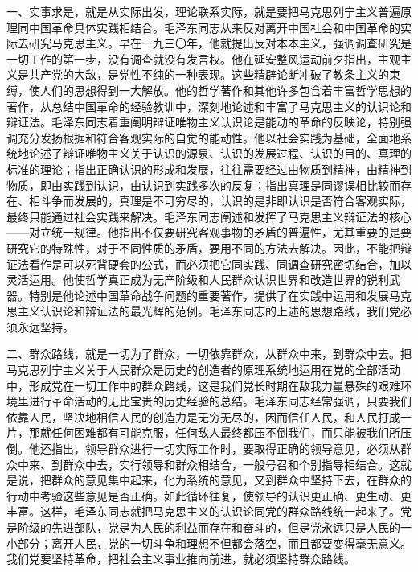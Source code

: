 一、实事求是，就是从实际出发，理论联系实际，就是要把马克思列宁主义普遍原理同中国革命具体实践相结合。毛泽东同志从来反对离开中国社会和中国革命的实际去研究马克思主义。早在一九三〇年，他就提出反对本本主义，强调调查研究是一切工作的第一步，没有调查就没有发言权。他在延安整风运动前夕指出，主观主义是共产党的大敌，是党性不纯的一种表现。这些精辟论断冲破了教条主义的束缚，使人们的思想得到一大解放。他的哲学著作和其他许多包含着丰富哲学思想的著作，从总结中国革命的经验教训中，深刻地论述和丰富了马克思主义的认识论和辩证法。毛泽东同志着重阐明辩证唯物主义认识论是能动的革命的反映论，特别强调充分发扬根据和符合客观实际的自觉的能动性。他以社会实践为基础，全面地系统地论述了辩证唯物主义关于认识的源泉、认识的发展过程、认识的目的、真理的标准的理论；指出正确认识的形成和发展，往往需要经过由物质到精神，由精神到物质，即由实践到认识，由认识到实践多次的反复；指出真理是同谬误相比较而存在、相斗争而发展的，真理是不可穷尽的，认识的是非即认识是否符合客观实际，最终只能通过社会实践来解决。毛泽东同志阐述和发挥了马克思主义辩证法的核心——对立统一规律。他指出不仅要研究客观事物的矛盾的普遍性，尤其重要的是要研究它的特殊性，对于不同性质的矛盾，要用不同的方法去解决。因此，不能把辩证法看作是可以死背硬套的公式，而必须把它同实践、同调查研究密切结合，加以灵活运用。他使哲学真正成为无产阶级和人民群众认识世界和改造世界的锐利武器。特别是他论述中国革命战争问题的重要著作，提供了在实践中运用和发展马克思主义认识论和辩证法的最光辉的范例。毛泽东同志的上述的思想路线，我们党必须永远坚持。

二、群众路线，就是一切为了群众，一切依靠群众，从群众中来，到群众中去。把马克思列宁主义关于人民群众是历史的创造者的原理系统地运用在党的全部活动中，形成党在一切工作中的群众路线，这是我们党长时期在敌我力量悬殊的艰难环境里进行革命活动的无比宝贵的历史经验的总结。毛泽东同志经常强调，只要我们依靠人民，坚决地相信人民的创造力是无穷无尽的，因而信任人民，和人民打成一片，那就任何困难都有可能克服，任何敌人最终都压不倒我们，而只能被我们所压倒。他还指出，领导群众进行一切实际工作时，要取得正确的领导意见，必须从群众中来、到群众中去，实行领导和群众相结合，一般号召和个别指导相结合。这就是说，把群众的意见集中起来，化为系统的意见，又到群众中坚持下去，在群众的行动中考验这些意见是否正确。如此循环往复，使领导的认识更正确、更生动、更丰富。这样，毛泽东同志就把马克思主义的认识论同党的群众路线统一起来了。党是阶级的先进部队，党是为人民的利益而存在和奋斗的，但是党永远只是人民的一小部分；离开人民，党的一切斗争和理想不但都会落空，而且都要变得毫无意义。我们党要坚持革命，把社会主义事业推向前进，就必须坚持群众路线。

